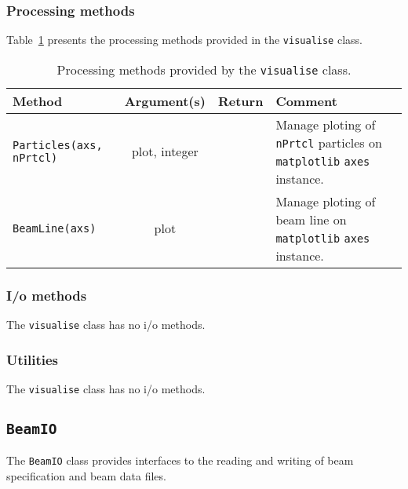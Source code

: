 \subsubsection{Processing methods}
\noindent
Table~\ref{Tab:vis:ProcMethods} presents the processing methods provided
in the \texttt{visualise} class.
\begin{table}[h]
  \caption{
    Processing methods provided by the \texttt{visualise}
    class. 
  }
  \label{Tab:vis:ProcMethods}
  \begin{center}
    \begin{tabular}{|l|c|c|p{7cm}|}
      \hline
      \textbf{Method} & \textbf{Argument(s)} & \textbf{Return} & \textbf{Comment}                                                       \\
      \hline
      \texttt{Particles(axs, nPrtcl)} & plot, integer  & & Manage ploting of \texttt{nPrtcl} particles on \texttt{matplotlib} \texttt{axes}
                                                           instance.                                                                    \\
      \texttt{BeamLine(axs)}          & plot           & & Manage ploting of beam line on \texttt{matplotlib} \texttt{axes} instance.   \\
      \hline
    \end{tabular}
  \end{center}
\end{table}

\subsubsection{I/o methods}
\noindent
The \texttt{visualise} class has no i/o methods.

\subsubsection{Utilities}
\noindent
The \texttt{visualise} class has no i/o methods.

\FloatBarrier

\subsection{\texttt{BeamIO}}
\label{SubSect:BmIO}

The \texttt{BeamIO} class provides interfaces to the reading and
writing of beam specification and beam data files.


